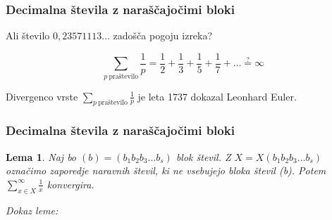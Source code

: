 \documentclass{beamer}
\newtheorem{lema}{Lema}
\begin{document}
\begin{frame}\frametitle{Decimalna števila z naraščajočimi bloki}

    Ali število $0,23571113\dots$ zadošča pogoju izreka?
    \pause
    
    \[
        \sum_{p \ \text{praštevilo}}\frac{1}{p} =
        \frac{1}{2} + \frac{1}{3} + \frac{1}{5} + \frac{1}{7} + \dots \overset{?}{=} \infty \]
    \pause

    Divergenco vrste $\sum_{p \ \text{praštevilo}}\frac{1}{p}$ je leta 1737 dokazal Leonhard Euler.

\end{frame}

\begin{frame}\frametitle{Decimalna števila z naraščajočimi bloki}

    \begin{lema}
        Naj bo $(b) = (b_1b_2b_3 \dots b_s)$ blok števil. Z $X = X(b_1b_2b_3 \dots b_s)$ označimo
        zaporedje naravnih števil, ki ne vsebujejo bloka števil (b). Potem 
        $\sum_{x \in X}^{\infty} \frac{1}{x}$ konvergira.
    \end{lema}
    \emph{Dokaz leme:}
    \newline
    \newline
    \newline
    \newline
    \newline
    \newline
    \newline
    \newline
    \newline
    \newline
    \newline
    \newline
    \newline
\end{frame}

\begin{frame}
\end{frame}
\end{document}
